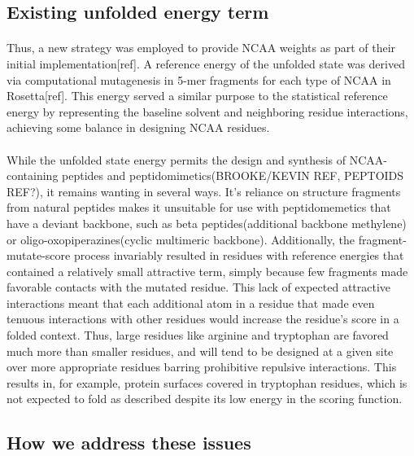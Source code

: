 \subsection{Existing unfolded energy term}

\paragraph{}
Thus, a new strategy was employed to provide NCAA weights as part of their initial implementation[ref].
A reference energy of the unfolded state was derived via computational mutagenesis in 5-mer fragments for each type of NCAA in Rosetta[ref].
This energy served a similar purpose to the statistical reference energy by representing the baseline solvent and neighboring residue interactions, achieving some balance in designing NCAA residues.

\paragraph{}
While the unfolded state energy permits the design and synthesis of NCAA-containing peptides and peptidomimetics(BROOKE/KEVIN REF, PEPTOIDS REF?), it remains wanting in several ways.
It's reliance on structure fragments from natural peptides makes it unsuitable for use with peptidomemetics that have a deviant backbone, such as beta peptides(additional backbone methylene) or oligo-oxopiperazines(cyclic multimeric backbone).
Additionally, the fragment-mutate-score process invariably resulted in residues with reference energies that contained a relatively small attractive term, simply because few fragments made favorable contacts with the mutated residue.
This lack of expected attractive interactions meant that each additional atom in a residue that made even tenuous interactions with other residues would increase the residue's score in a folded context.
Thus, large residues like arginine and tryptophan are favored much more than smaller residues, and will tend to be designed at a given site over more appropriate residues barring prohibitive repulsive interactions.
This results in, for example, protein surfaces covered in tryptophan residues, which is not expected to fold as described despite its low energy in the scoring function.

\subsection{How we address these issues}
